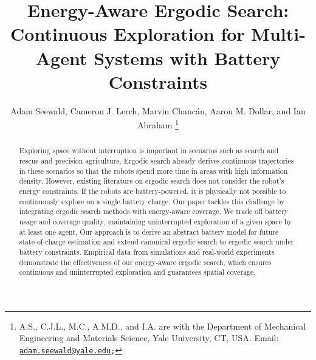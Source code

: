 \documentclass[letterpaper,10pt,conference,twoside]{IEEEtran}
\theoremstyle{definition}
\begin{document}

\title{\LARGE\bf Energy-Aware Ergodic Search: Continuous Exploration for Multi-Agent Systems with Battery Constraints}

\author{Adam Seewald, Cameron J. Lerch, Marvin Chanc{\'a}n, Aaron M. Dollar, and Ian Abraham
  \thanks{A.\hspace*{.4ex}S., C.\hspace*{.4ex}J.\hspace*{.4ex}L., M.\hspace*{.4ex}C., A.\hspace*{.4ex}M.\hspace*{.4ex}D., and I.\hspace*{.4ex}A. are with the Department of Mechanical Engineering and Materials Science, Yale University, CT, USA. Email: {\tt\footnotesize \href{mailto:adam.seewald@yale.edu}{adam.seewald@yale.edu};}}
}

\maketitle

\vspace*{-.5cm}
\begin{abstract} 
  Exploring space without interruption is important in scenarios such as search and rescue and precision agriculture. Ergodic search already derives continuous %
  trajectories in these scenarios so that the robots spend more time in areas with high information density. 
  However, existing literature on ergodic search does not consider the robot's energy constraints. 
  If the robots are battery-powered, it is physically not possible to continuously explore %
  on a single battery charge. Our paper tackles this challenge by integrating ergodic search methods with energy-aware coverage. We trade off battery usage and coverage quality, maintaining uninterrupted exploration of a given space by at least one agent. Our approach is to derive an abstract battery model for future state-of-charge estimation and extend canonical ergodic search to ergodic search under battery constraints. Empirical data from simulations and real-world experiments demonstrate the effectiveness of our energy-aware ergodic search, which ensures continuous and uninterrupted exploration and guarantees spatial coverage.
\end{abstract}
\end{document}
